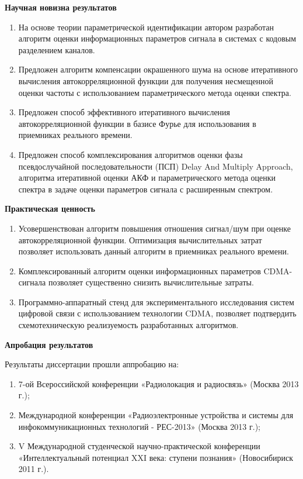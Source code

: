{\bf{Научная новизна результатов}}
\begin{enumerate}
	\item{На основе теории параметрической идентификации автором разработан алгоритм оценки информационных параметров сигнала в системах с кодовым разделением каналов.}
	\item{Предложен алгоритм компенсации окрашенного шума на основе итеративного вычисления автокорреляционной функции для
		получения несмещенной оценки частоты с использованием параметрического метода оценки спектра.}
	\item{Предложен способ эффективного итеративного вычисления автокорреляционной функции в базисе Фурье для использования в
		приемниках реального времени.}
	\item{Предложен способ комплексирования алгоритмов оценки фазы псевдослучайной последовательности (ПСП) Delay And Multiply Approach, алгоритма итеративной оценки АКФ и
		параметрического метода оценки спектра в задаче оценки параметров сигнала с расширенным спектром.}
\end{enumerate}

{\bf{Практическая ценность}}
\begin{enumerate}
	\item {Усовершенствован алгоритм повышения отношения сигнал/шум при оценке автокорреляционной функции. Оптимизация вычислительных затрат позволяет использовать
		данный алгоритм в приемниках реального времени.}
	\item {Комплексированный алгоритм оценки информационных параметров CDMA-сигнала позволяет существенно снизить вычислительные затраты.}
	\item {Программно-аппаратный стенд для экспериментального исследования систем цифровой связи с использованием технологии CDMA,
		позволяет подтвердить схемотехническую реализуемость разработанных алгоритмов.}
\end{enumerate}

{\bf{Апробация результатов}}

Результаты диссертации прошли аппробацию на:
\begin{enumerate}
	\item 7-ой Всероссийской конференции «Радиолокация и радиосвязь» (Москва 2013 г.);
	\item Международной конференции «Радиоэлектронные устройства и системы для инфокоммуникационных технологий - РЕС-2013» (Москва 2013 г.);
	\item V Международной студенческой научно-практической конференции «Интеллектуальный потенциал XXI века: ступени познания» (Новосибириск 2011 г.).
\end{enumerate}

